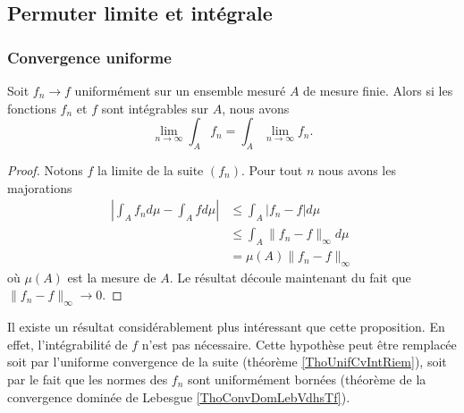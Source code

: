 \subsection{Permuter limite et intégrale}

\subsubsection{Convergence uniforme}

\begin{proposition}       \label{PropbhKnth}
    Soit \( f_n\to f\) uniformément sur un ensemble mesuré \( A\) de mesure finie. Alors si les fonctions \( f_n\) et \( f\) sont intégrables sur \( A\), nous avons
    \begin{equation}
        \lim_{n\to \infty} \int_A f_n=\int_A \lim_{n\to \infty} f_n.
    \end{equation}
\end{proposition}

\begin{proof}
    Notons \( f\) la limite de la suite \( (f_n)\). Pour tout \( n\) nous avons les majorations
    \begin{subequations}
        \begin{align}
            \left| \int_A f_n d\mu-\int_A fd\mu \right| &\leq \int_A| f_n-f |d\mu\\
            &\leq \int_A \| f_n-f \|_{\infty}d\mu\\
            &=\mu(A)\| f_n-f \|_{\infty}
        \end{align}
    \end{subequations}
    où \( \mu(A)\) est la mesure de \( A\). Le résultat découle maintenant du fait que \( \| f_n-f \|_{\infty}\to 0\).
\end{proof}
Il existe un résultat considérablement plus intéressant que cette proposition. En effet, l'intégrabilité de \( f\) n'est pas nécessaire. Cette hypothèse peut être remplacée soit par l'uniforme convergence de la suite (théorème \ref{ThoUnifCvIntRiem}), soit par le fait que les normes des \( f_n\) sont uniformément bornées (théorème de la convergence dominée de Lebesgue \ref{ThoConvDomLebVdhsTf}).

